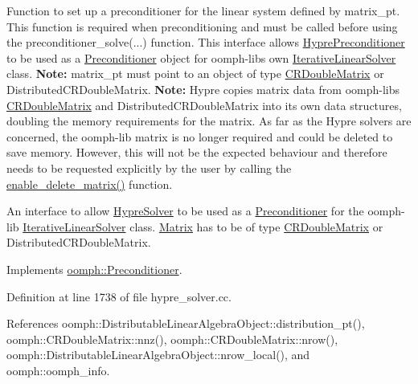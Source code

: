 Function to set up a preconditioner for the linear system defined by matrix\+\_\+pt. This function is required when preconditioning and must be called before using the preconditioner\+\_\+solve(...) function. This interface allows \hyperlink{classoomph_1_1HyprePreconditioner}{Hypre\+Preconditioner} to be used as a \hyperlink{classoomph_1_1Preconditioner}{Preconditioner} object for oomph-\/lib\textquotesingle{}s own \hyperlink{classoomph_1_1IterativeLinearSolver}{Iterative\+Linear\+Solver} class. {\bfseries Note\+:} matrix\+\_\+pt must point to an object of type \hyperlink{classoomph_1_1CRDoubleMatrix}{C\+R\+Double\+Matrix} or Distributed\+C\+R\+Double\+Matrix. {\bfseries Note\+:} Hypre copies matrix data from oomph-\/lib\textquotesingle{}s \hyperlink{classoomph_1_1CRDoubleMatrix}{C\+R\+Double\+Matrix} and Distributed\+C\+R\+Double\+Matrix into its own data structures, doubling the memory requirements for the matrix. As far as the Hypre solvers are concerned, the oomph-\/lib matrix is no longer required and could be deleted to save memory. However, this will not be the expected behaviour and therefore needs to be requested explicitly by the user by calling the \hyperlink{classoomph_1_1HyprePreconditioner_a350716ddfca241e83904895e0d5c3f6f}{enable\+\_\+delete\+\_\+matrix()} function. 

An interface to allow \hyperlink{classoomph_1_1HypreSolver}{Hypre\+Solver} to be used as a \hyperlink{classoomph_1_1Preconditioner}{Preconditioner} for the oomph-\/lib \hyperlink{classoomph_1_1IterativeLinearSolver}{Iterative\+Linear\+Solver} class. \hyperlink{classoomph_1_1Matrix}{Matrix} has to be of type \hyperlink{classoomph_1_1CRDoubleMatrix}{C\+R\+Double\+Matrix} or Distributed\+C\+R\+Double\+Matrix. 

Implements \hyperlink{classoomph_1_1Preconditioner_af4886f4efe510e5c9b0eb19422943588}{oomph\+::\+Preconditioner}.



Definition at line 1738 of file hypre\+\_\+solver.\+cc.



References oomph\+::\+Distributable\+Linear\+Algebra\+Object\+::distribution\+\_\+pt(), oomph\+::\+C\+R\+Double\+Matrix\+::nnz(), oomph\+::\+C\+R\+Double\+Matrix\+::nrow(), oomph\+::\+Distributable\+Linear\+Algebra\+Object\+::nrow\+\_\+local(), and oomph\+::oomph\+\_\+info.

\mbox{\label{classoomph_1_1HyprePreconditioner_aa120789b545e8562d24a7e4f8799715f}} 

